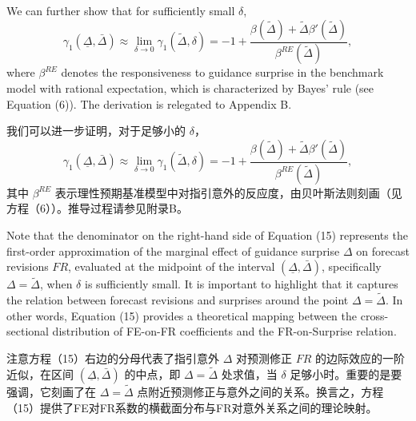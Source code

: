 \documentclass[12pt,a4paper]{article}
\newenvironment{original}
  {\par\medskip\noindent\ignorespaces}
  {\par\medskip}
\newenvironment{translation}
  {\par\noindent{\color{transblue}\ignorespaces}}
  {\par\bigskip}
\begin{document}
\begin{original}
We can further show that for sufficiently small $\delta$,
\[
\gamma_1(\underline{\Delta}, \bar{\Delta}) \approx \lim_{\delta \to 0} \gamma_1(\tilde{\Delta}, \delta) = -1 + \frac{\beta(\tilde{\Delta}) + \tilde{\Delta} \beta'(\tilde{\Delta})}{\beta^{RE}(\tilde{\Delta})}, \tag{15}
\]
where $\beta^{RE}$ denotes the responsiveness to guidance surprise in the benchmark model with rational expectation, which is characterized by Bayes' rule (see Equation (6)). The derivation is relegated to Appendix B.
\end{original}
\begin{translation}
我们可以进一步证明，对于足够小的 $\delta$，
\[
\gamma_1(\underline{\Delta}, \bar{\Delta}) \approx \lim_{\delta \to 0} \gamma_1(\tilde{\Delta}, \delta) = -1 + \frac{\beta(\tilde{\Delta}) + \tilde{\Delta} \beta'(\tilde{\Delta})}{\beta^{RE}(\tilde{\Delta})}, \tag{15}
\]
其中 $\beta^{RE}$ 表示理性预期基准模型中对指引意外的反应度，由贝叶斯法则刻画（见方程（6））。推导过程请参见附录B。
\end{translation}

\begin{original}
Note that the denominator on the right-hand side of Equation (15) represents the first-order approximation of the marginal effect of guidance surprise $\Delta$ on forecast revisions $FR$, evaluated at the midpoint of the interval $(\underline{\Delta}, \bar{\Delta})$, specifically $\Delta = \tilde{\Delta}$, when $\delta$ is sufficiently small. It is important to highlight that it captures the relation between forecast revisions and surprises around the point $\Delta = \tilde{\Delta}$. In other words, Equation (15) provides a theoretical mapping between the cross-sectional distribution of FE-on-FR coefficients and the FR-on-Surprise relation.
\end{original}
\begin{translation}
注意方程（15）右边的分母代表了指引意外 $\Delta$ 对预测修正 $FR$ 的边际效应的一阶近似，在区间 $(\underline{\Delta}, \bar{\Delta})$ 的中点，即 $\Delta = \tilde{\Delta}$ 处求值，当 $\delta$ 足够小时。重要的是要强调，它刻画了在 $\Delta = \tilde{\Delta}$ 点附近预测修正与意外之间的关系。换言之，方程（15）提供了FE对FR系数的横截面分布与FR对意外关系之间的理论映射。
\end{translation}
\end{document}
